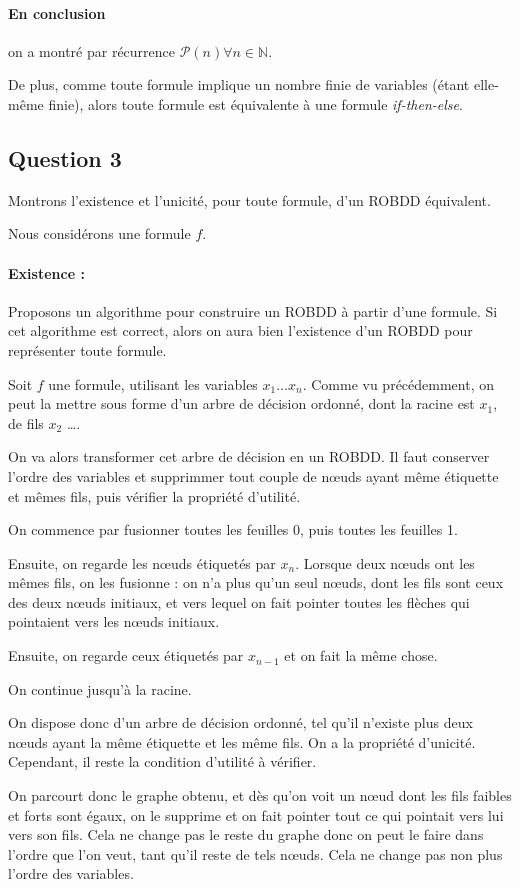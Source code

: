 \documentclass[12pt]{article}
\def\question#1{\subsection*{Question #1}}
\def\ite{\textit{if-then-else}}
\def\P{\mathcal{P}}
\begin{document}
\paragraph{En conclusion} on a montré par récurrence $\P (n)\forall n\in\mathbb{N}$.

De plus, comme toute formule implique un nombre finie de variables (étant elle-même finie), alors toute formule est équivalente à une formule \ite.

\question{3}
Montrons l'existence et l'unicité, pour toute formule, d'un ROBDD équivalent.

Nous considérons une formule $f$.
\paragraph{Existence :}
Proposons un algorithme pour construire un ROBDD à partir d'une formule. Si cet algorithme est correct, alors on aura bien l'existence d'un ROBDD pour représenter toute formule.

Soit $f$ une formule, utilisant les variables $x_1\dots x_n$. Comme vu précédemment, on peut la mettre sous forme d'un arbre de décision ordonné, dont la racine est $x_1$, de fils $x_2$ \dots.

On va alors transformer cet arbre de décision en un ROBDD. Il faut conserver l'ordre des variables et supprimmer tout couple de n\oe uds ayant même étiquette et mêmes fils, puis vérifier la propriété d'utilité.

On commence par fusionner toutes les feuilles 0, puis toutes les feuilles 1.

Ensuite, on regarde les n\oe uds étiquetés par $x_n$. Lorsque deux n\oe uds ont les mêmes fils, on les fusionne : on n'a plus qu'un seul n\oe uds, dont les fils sont ceux des deux n\oe uds initiaux, et vers lequel on fait pointer toutes les flèches qui pointaient vers les n\oe uds initiaux.

Ensuite, on regarde ceux étiquetés par $x_{n-1}$ et on fait la même chose.

On continue jusqu'à la racine.

On dispose donc d'un arbre de décision ordonné, tel qu'il n'existe plus deux n\oe uds ayant la même étiquette et les même fils. On a la propriété d'unicité. Cependant, il reste la condition d'utilité à vérifier.

On parcourt donc le graphe obtenu, et dès qu'on voit un n\oe ud dont les fils faibles et forts sont égaux, on le supprime et on fait pointer tout ce qui pointait vers lui vers son fils. Cela ne change pas le reste du graphe donc on peut le faire dans l'ordre que l'on veut, tant qu'il reste de tels n\oe uds. Cela ne change pas non plus l'ordre des variables.
\end{document}
